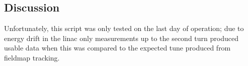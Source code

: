 \documentclass[../main.tex]{subfiles}
\begin{document}
\subsection{Discussion}
\label{sec:chromaticity_discussion}

Unfortunately, this script was only tested on the last day of operation; due to energy drift in the linac only measurements
up to the second turn produced usable data when this was compared to the expected tune produced from fieldmap tracking.
\end{document}
